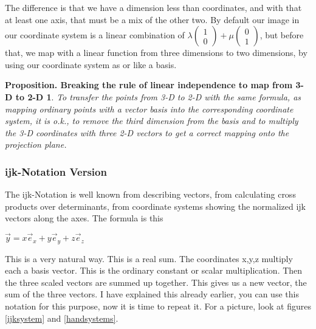 \documentclass[a4paper]{article}
\begin{document}
The difference is that we have a dimension less than coordinates, and with that at least one axis, that must be a mix of the other two. By default our image in our coordinate system is a linear combination of $\lambda\begin{pmatrix}1\\0\end{pmatrix} + \mu\begin{pmatrix}0\\1\end{pmatrix}$, but before that, we map with a linear function from three dimensions to two dimensions, by using our coordinate system as or like a basis. \\

\newtheorem{VectorBasisBrokenLaw}{Proposition. Breaking the rule of linear independence to map from 3-D to 2-D}
\begin{VectorBasisBrokenLaw}
\label{broken_law_basis}
To transfer the points from 3-D to 2-D with the same formula, as mapping ordinary points with a vector basis into 
the corresponding coordinate system, it is o.k., to remove the third dimension from the basis and to multiply the
3-D coordinates with three 2-D vectors to get a correct mapping onto the projection plane.
\end{VectorBasisBrokenLaw}

\subsubsection{ijk-Notation Version}

The ijk-Notation is well known from describing vectors, from calculating cross products over determinants, from coordinate systems showing the normalized ijk vectors along the axes. The formula is this\\

\begin{center}
 $\vec{y} = x\vec{e}_{x}+y\vec{e}_{y}+z\vec{e}_{z}$
\end{center}

This is a very natural way. This is a real sum. The coordinates x,y,z multiply each a basis vector. This is the ordinary constant or scalar multiplication. Then the three scaled vectors are summed up together. This gives us a new vector, the sum of the three vectors. I have explained this already earlier, you can use this notation for this purpose, now it is time to repeat it. For a picture, look at figures \ref{ijksystem} and \ref{handsystems}.\\
\end{document}
